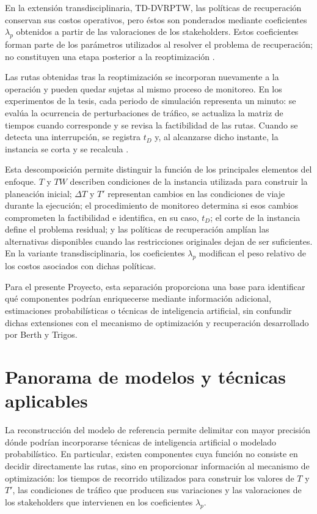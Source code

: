\documentclass[11pt]{article}
\begin{document}
En la extensión transdisciplinaria, TD-DVRPTW, las políticas de recuperación conservan
sus costos operativos, pero éstos son ponderados mediante coeficientes \(\lambda_p\)
obtenidos a partir de las valoraciones de los stakeholders. Estos coeficientes forman
parte de los parámetros utilizados al resolver el problema de recuperación; no
constituyen una etapa posterior a la reoptimización
\parencite{berth_thesis_2025}.

Las rutas obtenidas tras la reoptimización se incorporan nuevamente a la operación y
pueden quedar sujetas al mismo proceso de monitoreo. En los experimentos de la tesis,
cada periodo de simulación representa un minuto: se evalúa la ocurrencia de
perturbaciones de tráfico, se actualiza la matriz de tiempos cuando corresponde y se
revisa la factibilidad de las rutas. Cuando se detecta una interrupción, se registra
\(t_D\) y, al alcanzarse dicho instante, la instancia se corta y se recalcula
\parencite{berth_thesis_2025}.

Esta descomposición permite distinguir la función de los principales elementos del
enfoque. \(T\) y \(TW\) describen condiciones de la instancia utilizada para construir
la planeación inicial; \(\Delta T\) y \(T'\) representan cambios en las condiciones de
viaje durante la ejecución; el procedimiento de monitoreo determina si esos cambios
comprometen la factibilidad e identifica, en su caso, \(t_D\); el corte de la instancia
define el problema residual; y las políticas de recuperación amplían las alternativas
disponibles cuando las restricciones originales dejan de ser suficientes. En la variante
transdisciplinaria, los coeficientes \(\lambda_p\) modifican el peso relativo de los
costos asociados con dichas políticas.

Para el presente Proyecto, esta separación proporciona una base para identificar
qué componentes podrían enriquecerse mediante información adicional, estimaciones
probabilísticas o técnicas de inteligencia artificial, sin confundir dichas extensiones
con el mecanismo de optimización y recuperación desarrollado por Berth y Trigos.

\section{Panorama de modelos y técnicas aplicables}

La reconstrucción del modelo de referencia permite delimitar con mayor precisión
dónde podrían incorporarse técnicas de inteligencia artificial o modelado probabilístico.
En particular, existen componentes cuya función no consiste en decidir directamente
las rutas, sino en proporcionar información al mecanismo de optimización: los tiempos
de recorrido utilizados para construir los valores de \(T\) y \(T'\), las condiciones
de tráfico que producen sus variaciones y las valoraciones de los stakeholders que
intervienen en los coeficientes \(\lambda_p\).
\end{document}
